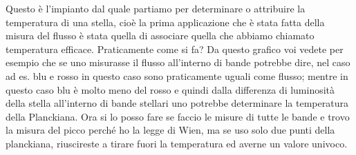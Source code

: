 \documentclass[a4paper,11pt]{article}
\begin{document}
Questo è l’impianto dal quale partiamo per determinare o attribuire la temperatura di una stella, cioè la prima applicazione che è stata fatta della misura del flusso è stata quella di associare quella che abbiamo chiamato temperatura efficace. Praticamente come si fa? 
\newline 
Da questo grafico voi vedete per esempio che se uno misurasse il flusso all’interno di bande potrebbe dire, nel caso ad es. blu e rosso in questo caso sono praticamente uguali come flusso; mentre in questo caso blu è molto meno del rosso e quindi dalla differenza di luminosità della stella all’interno di bande stellari uno potrebbe determinare la temperatura della Planckiana. Ora si lo posso fare se faccio le misure di tutte le bande e trovo la misura del picco perché ho la legge di Wien, ma se uso solo due punti della planckiana, riuscireste a tirare fuori la temperatura ed averne un valore univoco. 
\newline
\end{document}
